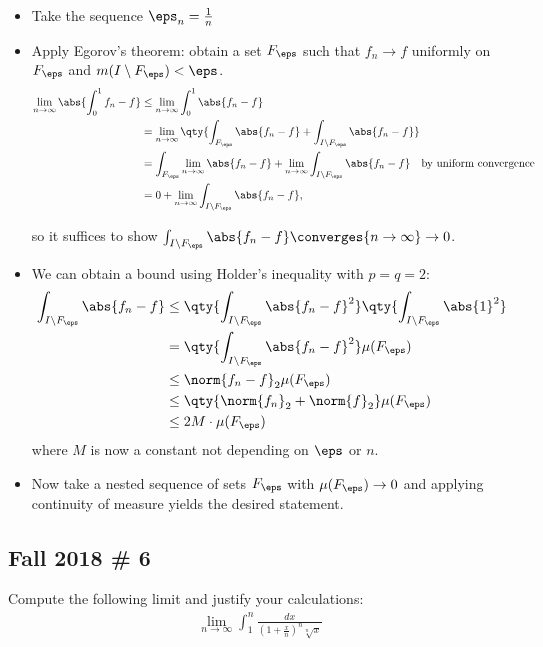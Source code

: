 \begin{solution}
\begin{itemize}
\item
  Take the sequence \(\eps_n = {1\over n}\)
\item
  Apply Egorov's theorem: obtain a set \(F_\eps\) such that
  \(f_n \to f\) uniformly on \(F_\eps\) and
  \(m(I\setminus F_\eps) < \eps\).
  \begin{align*}
  \lim_{n\to \infty} \abs{ \int_0^1 f_n - f }
  &\leq \lim_{n\to\infty} \int_0^1 \abs{f_n - f} \\
  &= \lim_{n\to\infty} \qty{ \int_{F_\eps} \abs{f_n - f} + \int_{I\setminus F_\eps} \abs{f_n - f} } \\
  &= \int_{F_\eps} \lim_{n\to\infty} \abs{f_n - f} + \lim_{n\to\infty} \int_{I\setminus F_\eps} \abs{f_n - f} \quad\text{by uniform convergence} \\ 
  &= 0 + \lim_{n\to\infty} \int_{I\setminus F_\eps} \abs{f_n - f}
  ,\end{align*}

  so it suffices to show
  \(\int_{I\setminus F_\eps} \abs{f_n - f} \converges{n\to\infty}\to 0\).
\item
  We can obtain a bound using Holder's inequality with \(p=q=2\):
  \begin{align*}
  \int_{I\setminus F_\eps} \abs{f_n - f} 
  &\leq \qty{ \int_{I\setminus F_\eps} \abs{f_n - f}^2 } \qty{ \int_{I\setminus F_\eps} \abs{1}^2  } \\
  &= \qty{ \int_{I\setminus F_\eps} \abs{f_n - f}^2 } \mu(F_\eps) \\
  &\leq \norm{f_n - f}_2 \mu(F_\eps) \\
  &\leq \qty{ \norm{f_n}_2 + \norm{f}_2 } \mu(F_\eps) \\
  &\leq 2M \cdot \mu(F_\eps)
  \end{align*} where \(M\) is now a constant not depending on \(\eps\)
  or \(n\).
\item
  Now take a nested sequence of sets \(F_{\eps}\) with
  \(\mu(F_\eps) \to 0\) and applying continuity of measure yields the
  desired statement.
\end{itemize}

\end{solution}

\hypertarget{fall-2018-6}{%
\subsection{Fall 2018 \# 6}\label{fall-2018-6}}

Compute the following limit and justify your calculations:
\begin{align*}
\lim_{n \rightarrow \infty} \int_{1}^{n} \frac{d x}{\left(1+\frac{x}{n}\right)^{n} \sqrt[n]{x}}
\end{align*}


